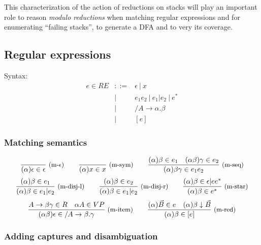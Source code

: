 \documentclass{article}
\begin{document}
This characterization of the action of reductions on stacks will play an important role to reason {\em modulo reductions} when matching regular expressions and for enumerating ``failing stacks'', to generate a DFA and to very its coverage.


\subsection{Regular expressions}

Syntax:
\[
\begin{array}{rrl}
  e \in RE &::=& \epsilon\ |\ x
  \\  &|& e_1 e_2 \ |\ e_1 | e_2 \ |\ e^*
  \\  &|& /A \rightarrow \alpha.\beta
  \\  &|& [e]
\end{array}
\]

\subsubsection{Matching semantics}

\newcommand\dre[3]{(#1) #2 \in #3}

\[
\Rule{}
     {\dre{\alpha}{\epsilon}{\epsilon}}
     {m-$\epsilon$}
\qquad
\Rule{}
     {\dre{\alpha}{x}{x}}
     {m-sym}
\qquad
\Rule{\dre{\alpha}{\beta}{e_1}\quad\dre{\alpha\beta}{\gamma}{e_2}}
     {\dre{\alpha}{\beta\gamma}{e_1e_2}}
     {m-seq}
\]
\[
\Rule{\dre{\alpha}{\beta}{e_1}}
     {\dre{\alpha}{\beta}{e_1|e_2}}
     {m-disj-l}
\qquad
\Rule{\dre{\alpha}{\beta}{e_2}}
     {\dre{\alpha}{\beta}{e_1|e_2}}
     {m-disj-r}
\qquad
\Rule{\dre{\alpha}{\beta}{\epsilon|ee^*}}
     {\dre{\alpha}{\beta}{e^*}}
     {m-star}
\]
\[
\Rule{A \rightarrow \beta \gamma \in R \quad \alpha A \in VP}
     {\dre{\alpha\beta}{\epsilon}{/A\rightarrow \beta.\gamma}}
     {m-item}
\qquad
\Rule{\dre{\alpha}{\vec{B}}{e} \quad \dred{\alpha}{\beta}{\vec B}}
     {\dre{\alpha}{\beta}{[e]}}
     {m-red}
\]

\subsubsection{Adding captures and disambiguation}
\end{document}
